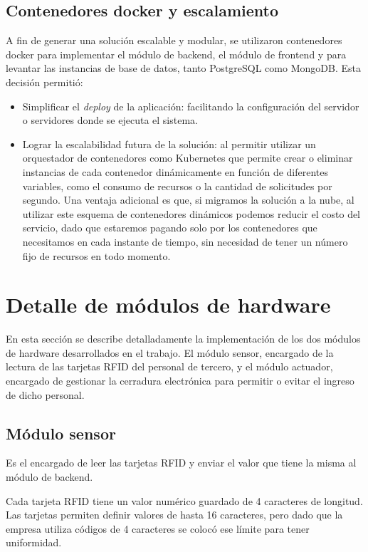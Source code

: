 \subsection{Contenedores docker y escalamiento}

A fin de generar una solución escalable y modular, se utilizaron contenedores docker para implementar el módulo de backend, el módulo de frontend y para levantar las instancias de base de datos, tanto PostgreSQL como MongoDB. Esta decisión permitió:

\begin{itemize}
\item Simplificar el \textit{deploy} de la aplicación: facilitando la configuración del servidor o servidores donde se ejecuta el sistema.
\item Lograr la escalabilidad futura de la solución: al permitir utilizar un orquestador de contenedores como Kubernetes que permite crear o eliminar instancias de cada contenedor dinámicamente en función de diferentes variables, como el consumo de recursos o la cantidad de solicitudes por segundo. Una ventaja adicional es que, si migramos la solución a la nube, al utilizar este esquema de contenedores dinámicos podemos reducir el costo del servicio, dado que estaremos pagando solo por los contenedores que necesitamos en cada instante de tiempo, sin necesidad de tener un número fijo de recursos en todo momento.
\end{itemize}

\section{Detalle de módulos de hardware}

En esta sección se describe detalladamente la implementación de los dos módulos de hardware desarrollados en el trabajo. El módulo sensor, encargado de la lectura de las tarjetas RFID del personal de tercero, y el módulo actuador, encargado de gestionar la cerradura electrónica para permitir o evitar el ingreso de dicho personal.

\subsection{Módulo sensor}

Es el encargado de leer las tarjetas RFID y enviar el valor que tiene la misma al módulo de backend.

Cada tarjeta RFID tiene un valor numérico guardado de 4 caracteres de longitud. Las tarjetas permiten definir valores de hasta 16 caracteres, pero dado que la empresa utiliza códigos de 4 caracteres se colocó ese límite para tener uniformidad.

